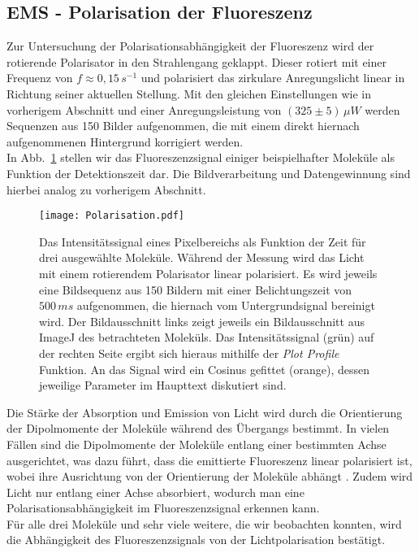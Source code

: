 \subsection{\label{subsec:A3}EMS - Polarisation der Fluoreszenz}
Zur Untersuchung der Polarisationsabhängigkeit der Fluoreszenz wird der rotierende Polarisator in den 
Strahlengang geklappt. Dieser rotiert mit einer Frequenz von $f\approx 0,15\,\si{s^{-1}}$ und 
polarisiert das zirkulare Anregungslicht linear in Richtung seiner aktuellen Stellung. 
Mit den gleichen Einstellungen wie in vorherigem Abschnitt und einer Anregungsleistung von $\left(325\pm5\right)\,\si{\mu W}$ werden 
Sequenzen aus 150 Bilder aufgenommen, 
die mit einem direkt hiernach aufgenommenen Hintergrund korrigiert werden. \\
In Abb.~\ref{fig:polari} stellen wir das Fluoreszenzsignal einiger beispielhafter Moleküle als Funktion der 
Detektionszeit dar. Die Bildverarbeitung und Datengewinnung sind hierbei analog zu vorherigem Abschnitt.
\begin{figure}[h!]
    \centering
    \texttt{[image: Polarisation.pdf]}
    \caption{\label{fig:polari}Das Intensitätssignal eines Pixelbereichs als Funktion
    der Zeit für drei ausgewählte Moleküle. 
    Während der Messung wird das Licht mit einem rotierendem
    Polarisator linear polarisiert. Es wird jeweils eine Bildsequenz aus 150 Bildern mit einer Belichtungszeit von 
    $500\,\si{ms}$ aufgenommen, die hiernach vom Untergrundsignal bereinigt wird. Der Bildausschnitt links zeigt jeweils 
    ein Bildausschnitt aus ImageJ des betrachteten Moleküls. Das Intensitätssignal (grün) auf der rechten Seite ergibt sich 
    hieraus mithilfe der \textit{Plot Profile} Funktion. An das Signal wird ein Cosinus gefittet (orange), dessen 
    jeweilige Parameter im Haupttext diskutiert sind.}
\end{figure}\FloatBarrier
Die Stärke der Absorption und Emission von Licht wird durch die Orientierung der Dipolmomente der Moleküle während des 
Übergangs bestimmt. In vielen Fällen sind die Dipolmomente der Moleküle entlang einer bestimmten Achse ausgerichtet, 
was dazu führt, dass die emittierte Fluoreszenz linear polarisiert ist, wobei ihre Ausrichtung 
von der Orientierung der Moleküle abhängt \cite{Prinzip}. Zudem wird Licht nur entlang einer Achse absorbiert, 
wodurch man eine Polarisationsabhängigkeit im Fluoreszenzsignal erkennen kann. \\
Für alle drei Moleküle und sehr viele weitere, die wir beobachten konnten, wird die 
Abhängigkeit des Fluoreszenzsignals von der Lichtpolarisation bestätigt. 
